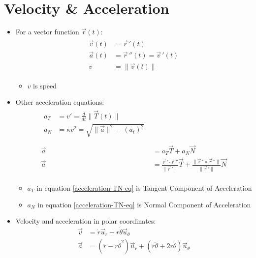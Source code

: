 \documentclass{article}
\begin{document}
\section{Velocity \& Acceleration}
\begin{itemize}
  \item For a vector function $\vec{r}(t)$:
  \begin{align}
    \begin{split}
      \vec{v}(t) &= \vec{r}\,'(t) \\
      \vec{a}(t) &= \vec{r}\,''(t) = \vec{v}\,'(t) \\
      v &= \|\vec{v}(t)\|
    \end{split}
  \end{align}
  \begin{itemize}
    \item $v$ is speed
  \end{itemize}
  \item Other acceleration equations:
  \begin{align}
    \begin{split}
      a_T &= v' = \frac{d}{dt}\|\vec{T}(t)\| \\
      a_N &= \kappa v^2 = \sqrt{\|\vec{a}\|^2 - (a_t)^2} \\
    \end{split} \\
    \vec{a} &= a_T\vec{T} + a_N\vec{N} \label{acceleration-TN-eq} \\
    \vec{a} &= \frac{\vec{r}\,'\cdot\vec{r}\,''}{\|\vec{r}\,'\|}\vec{T} + \frac{\|\vec{r}\,'\times\vec{r}\,''\|}{\|\vec{r}\,'\|}\vec{N} \\
  \end{align}
  \begin{itemize}
    \item $a_T$ in equation \ref{acceleration-TN-eq} is Tangent Component of Acceleration
    \item $a_N$ in equation \ref{acceleration-TN-eq} is Normal Component of Acceleration
  \end{itemize}
  \item Velocity and acceleration in polar coordinates:
  \begin{align}
    \vec{v} &= \dot{r}\vec{u}_r + r\dot{\theta}\vec{u}_\theta \\
    \vec{a} &= (\ddot{r} - r\dot{\theta}^2)\vec{u}_r + (r\ddot{\theta} + 2\dot{r}\dot{\theta})\vec{u}_\theta
  \end{align}
  \begin{itemize}

\end{itemize}
\end{itemize}
\end{document}
